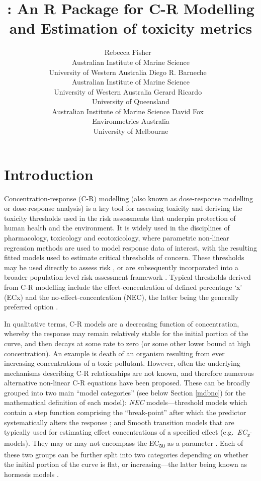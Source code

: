 \documentclass[
  shortnames]{jss}
\author{
			Rebecca Fisher
					~\orcidlink{0000-0001-5148-6731}
				\\
		Australian Institute of Marine Science
					\\University of Western Australia
				 \AND
			Diego R. Barneche
					~\orcidlink{0000-0002-4568-2362}
				\\
		Australian Institute of Marine Science
					\\University of Western Australia
				 \AND
			Gerard Ricardo
					~\orcidlink{0000-0002-7761-0806}
				\\
		University of Queensland
					\\Australian Institute of Marine Science
				 \AND
			David Fox
					~\orcidlink{0000-0002-3178-7243}
				\\
		Environmetrics Australia
					\\University of Melbourne
				}
\title{\pkg{bayesnec}: An R Package for C-R Modelling and Estimation of toxicity metrics}
\begin{document}
\hypertarget{introduction}{%
\section{Introduction}\label{introduction}}

Concentration-response (C-R) modelling (also known as dose-response modelling or dose-response analysis) is a key tool for assessing toxicity and deriving the toxicity thresholds used in the risk assessments that underpin protection of human health and the environment. It is widely used in the disciplines of pharmacology, toxicology and ecotoxicology, where parametric non-linear regression methods are used to model response data of interest, with the resulting fitted models used to estimate critical thresholds of concern. These thresholds may be used directly to assess risk \citep[e.g see][]{fisher2018c}, or are subsequently incorporated into a broader population-level risk assessment framework \citep[e.g.][]{Warne2015}. Typical thresholds derived from C-R modelling include the effect-concentration of defined percentage `x' (ECx) and the no-effect-concentration (NEC), the latter being the generally preferred option \citep{Fox2008, Warne2015, Warne2018c}.

In qualitative terms, C-R models are a decreasing function of concentration, whereby the response may remain relatively stable for the initial portion of the curve, and then decays at some rate to zero (or some other lower bound at high concentration). An example is death of an organism resulting from ever increasing concentrations of a toxic pollutant. However, often the underlying mechanisms describing C-R relationships are not known, and therefore numerous alternative non-linear C-R equations have been proposed. These can be broadly grouped into two main ``model categories'' (see below Section \ref{mdbnc}) for the mathematical definition of each model): \emph{NEC} models---threshold models which contain a step function comprising the ``break-point'' after which the predictor systematically alters the response \citep{Fox2010}; and Smooth transition models that are typically used for estimating effect concentrations of a specified effect (e.g.~\emph{EC\textsubscript{x}}- models). They may or may not encompass the EC\textsubscript{50} as a parameter \citep{Ritz2016}. Each of these two groups can be further split into two categories depending on whether the initial portion of the curve is flat, or increasing---the latter being known as hormesis models \citep{Ritz2016}.
\end{document}
